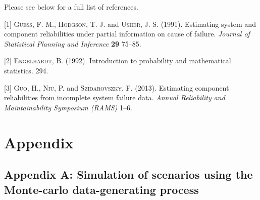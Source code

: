 \documentclass[
]{article}
\newenvironment{cslreferences}%
  {}%
  {\par}
\begin{document}
Please see below for a full list of references.

\hypertarget{refs}{}
\begin{cslreferences}
\leavevmode\hypertarget{ref-Fran-1991}{}%
{[}1{]} \textsc{Guess}, F. M., \textsc{Hodgson}, T. J. and
\textsc{Usher}, J. S. (1991). Estimating system and component
reliabilities under partial information on cause of failure.
\emph{Journal of Statistical Planning and Inference} \textbf{29} 75--85.

\leavevmode\hypertarget{ref-bain}{}%
{[}2{]} \textsc{Engelhardt}, B. (1992). Introduction to probability and
mathematical statistics. 294.

\leavevmode\hypertarget{ref-Huairu-2013}{}%
{[}3{]} \textsc{Guo}, H., \textsc{Niu}, P. and \textsc{Szidarovszky}, F.
(2013). Estimating component reliabilities from incomplete system
failure data. \emph{Annual Reliability and Maintainability Symposium
(RAMS)} 1--6.
\end{cslreferences}

\hypertarget{appendix}{%
\section*{Appendix}\label{appendix}}

\hypertarget{appendix-a-simulation-of-scenarios-using-the-monte-carlo-data-generating-process}{%
\subsection*{Appendix A: Simulation of scenarios using the Monte-carlo
data-generating
process}\label{appendix-a-simulation-of-scenarios-using-the-monte-carlo-data-generating-process}}
\end{document}
